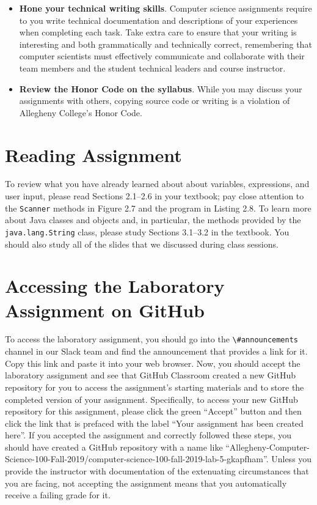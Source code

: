 \documentclass[11pt]{article}
\newcommand{\channel}[1]{\lstinline{#1}}
\begin{document}
\begin{itemize}
\item {\bf Hone your technical writing skills}. Computer science assignments
  require to you write technical documentation and descriptions of your
  experiences when completing each task. Take extra care to ensure that your
  writing is interesting and both grammatically and technically correct,
  remembering that computer scientists must effectively communicate and
  collaborate with their team members and the student technical leaders and
  course instructor.

\item {\bf Review the Honor Code on the syllabus}. While you may discuss your
  assignments with others, copying source code or writing is a violation of
  Allegheny College's Honor Code.

\end{itemize}

\section*{Reading Assignment}

To review what you have already learned about about variables, expressions, and
user input, please read Sections 2.1--2.6 in your textbook; pay close attention
to the {\tt Scanner} methods in Figure 2.7 and the program in Listing 2.8. To
learn more about Java classes and objects and, in particular, the methods
provided by the {\tt java.lang.String} class, please study Sections 3.1--3.2 in
the textbook. You should also study all of the slides that we discussed during
class sessions.


\section*{Accessing the Laboratory Assignment on GitHub}

To access the laboratory assignment, you should go into the
\channel{\#announcements} channel in our Slack team and find the announcement
that provides a link for it. Copy this link and paste it into your web browser.
Now, you should accept the laboratory assignment and see that GitHub Classroom
created a new GitHub repository for you to access the assignment's starting
materials and to store the completed version of your assignment. Specifically,
to access your new GitHub repository for this assignment, please click the green
``Accept'' button and then click the link that is prefaced with the label ``Your
assignment has been created here''. If you accepted the assignment and correctly
followed these steps, you should have created a GitHub repository with a name
like
``Allegheny-Computer-Science-100-Fall-2019/computer-science-100-fall-2019-lab-5-gkapfham''.
Unless you provide the instructor with documentation of the extenuating
circumstances that you are facing, not accepting the assignment means that you
automatically receive a failing grade for it.
\end{document}
